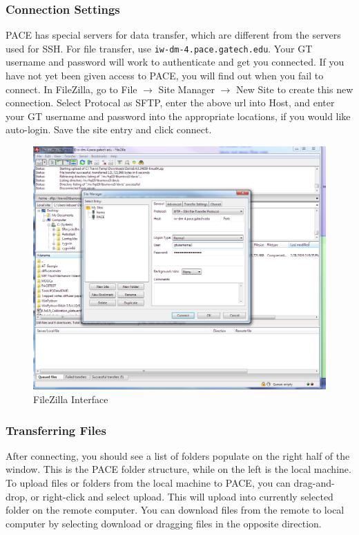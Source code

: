 \documentclass{article}
\begin{document}
	\subsubsection{Connection Settings}
	\label{connection}
	PACE has special servers for data transfer, which are different from the servers used for SSH.  For file transfer, use \nolinkurl{iw-dm-4.pace.gatech.edu}.  Your GT username and password will work to authenticate and get you connected.  If you have not yet been given access to PACE, you will find out when you fail to connect.  In FileZilla, go to File $\rightarrow$ Site Manager $\rightarrow$ New Site to create this new connection.  Select Protocal as SFTP, enter the above url into Host, and enter your GT username and password into the appropriate locations, if you would like auto-login.  Save the site entry and click connect.
	
	\begin{figure}[h!]
    	\centering
    	\includegraphics[width=6in]{./filezilla.png} 
    	\caption{FileZilla Interface}
	\end{figure}
	
	\subsubsection{Transferring Files}
	After connecting, you should see a list of folders populate on the right half of the window.  This is the PACE folder structure, while on the left is the local machine.  To upload files or folders from the local machine to PACE, you can drag-and-drop, or right-click and select upload.  This will upload into currently selected folder on the remote computer.  You can download files from the remote to local computer by selecting download or dragging files in the opposite direction.
	
\end{document}
